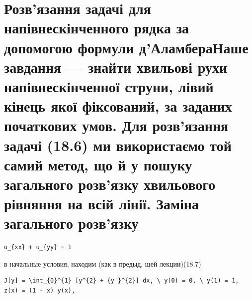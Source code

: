 \documentclass[
  ukrainian,
]{article}
\begin{document}
\section{Розв'язання задачі для напівнескінченного рядка за допомогою
формули д'АламбераНаше завдання --- знайти хвильові рухи
напівнескінченної струни, лівий кінець якої фіксований, за заданих
початкових умов. Для розв'язання задачі (18.6) ми використаємо той самий
метод, що й у пошуку загального розв'язку хвильового рівняння на всій
лінії. Заміна загального
розв'язку}\label{ux440ux43eux437ux432ux44fux437ux430ux43dux43dux44f-ux437ux430ux434ux430ux447ux456-ux434ux43bux44f-ux43dux430ux43fux456ux432ux43dux435ux441ux43aux456ux43dux447ux435ux43dux43dux43eux433ux43e-ux440ux44fux434ux43aux430-ux437ux430-ux434ux43eux43fux43eux43cux43eux433ux43eux44e-ux444ux43eux440ux43cux443ux43bux438-ux434ux430ux43bux430ux43cux431ux435ux440ux430ux43dux430ux448ux435-ux437ux430ux432ux434ux430ux43dux43dux44f-ux437ux43dux430ux439ux442ux438-ux445ux432ux438ux43bux44cux43eux432ux456-ux440ux443ux445ux438-ux43dux430ux43fux456ux432ux43dux435ux441ux43aux456ux43dux447ux435ux43dux43dux43eux457-ux441ux442ux440ux443ux43dux438-ux43bux456ux432ux438ux439-ux43aux456ux43dux435ux446ux44c-ux44fux43aux43eux457-ux444ux456ux43aux441ux43eux432ux430ux43dux438ux439-ux437ux430-ux437ux430ux434ux430ux43dux438ux445-ux43fux43eux447ux430ux442ux43aux43eux432ux438ux445-ux443ux43cux43eux432.-ux434ux43bux44f-ux440ux43eux437ux432ux44fux437ux430ux43dux43dux44f-ux437ux430ux434ux430ux447ux456-18.6-ux43cux438-ux432ux438ux43aux43eux440ux438ux441ux442ux430ux454ux43cux43e-ux442ux43eux439-ux441ux430ux43cux438ux439-ux43cux435ux442ux43eux434-ux449ux43e-ux439-ux443-ux43fux43eux448ux443ux43aux443-ux437ux430ux433ux430ux43bux44cux43dux43eux433ux43e-ux440ux43eux437ux432ux44fux437ux43aux443-ux445ux432ux438ux43bux44cux43eux432ux43eux433ux43e-ux440ux456ux432ux43dux44fux43dux43dux44f-ux43dux430-ux432ux441ux456ux439-ux43bux456ux43dux456ux457.-ux437ux430ux43cux456ux43dux430-ux437ux430ux433ux430ux43bux44cux43dux43eux433ux43e-ux440ux43eux437ux432ux44fux437ux43aux443}

\begin{verbatim}
u_{xx} + u_{yy} = 1
\end{verbatim}

в начальные условия, находим (как в предыд, щей лекции)(18.7)

\begin{verbatim}
J[y] = \int_{0}^{1} [y^{2} + {y'}^{2}] dx, \ y(0) = 0, \ y(1) = 1,
z(x) = (1 - x) y(x),
\end{verbatim}
\end{document}

